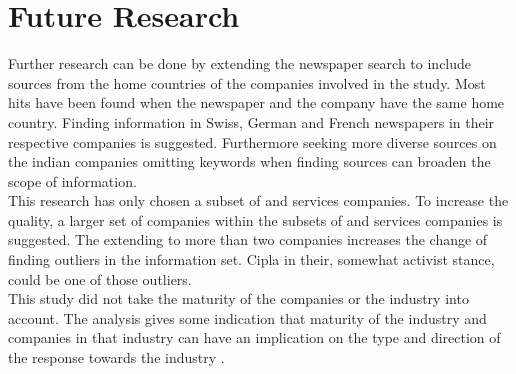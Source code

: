 \section{Future Research}

Further research can be done by extending the newspaper search to include sources from the home countries of the companies involved in the study.
Most hits have been found when the newspaper and the company have the same home country.
Finding information in Swiss, German and French newspapers in their respective companies is suggested.
Furthermore seeking more diverse sources on the indian companies omitting keywords when finding sources can broaden the scope of information.\\
This research has only chosen a subset of \manu and services companies.
To increase the quality, a larger set of companies within the subsets of \manu and services companies is suggested.
The extending to more than two companies increases the change of finding outliers in the information set.
Cipla in their, somewhat activist stance, could be one of those outliers.\\
This study did not take the maturity of the companies or the industry into account.
The analysis gives some indication that maturity of the industry and companies in that industry can have an implication on the type and direction of the response towards the industry \cc.
